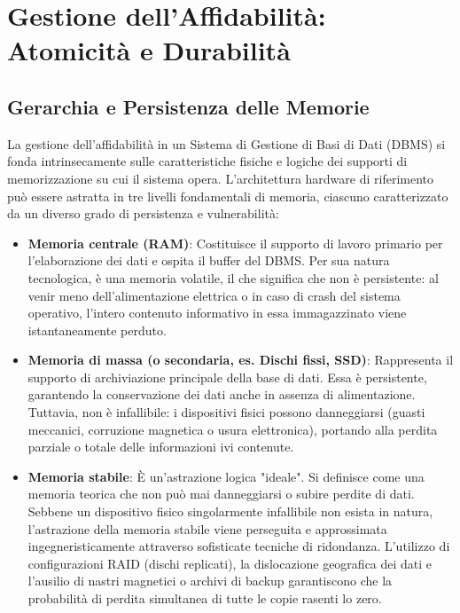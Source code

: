 \chapter{Gestione dell'Affidabilità: Atomicità e Durabilità}

\section{Gerarchia e Persistenza delle Memorie}

La gestione dell'affidabilità in un Sistema di Gestione di Basi di Dati (DBMS) si fonda intrinsecamente sulle caratteristiche fisiche e logiche dei supporti di memorizzazione su cui il sistema opera. L'architettura hardware di riferimento può essere astratta in tre livelli fondamentali di memoria, ciascuno caratterizzato da un diverso grado di persistenza e vulnerabilità:

\begin{itemize}
    \item \textbf{Memoria centrale (RAM)}: Costituisce il supporto di lavoro primario per l'elaborazione dei dati e ospita il buffer del DBMS. Per sua natura tecnologica, è una memoria volatile, il che significa che non è persistente: al venir meno dell'alimentazione elettrica o in caso di crash del sistema operativo, l'intero contenuto informativo in essa immagazzinato viene istantaneamente perduto.
    \item \textbf{Memoria di massa (o secondaria, es. Dischi fissi, SSD)}: Rappresenta il supporto di archiviazione principale della base di dati. Essa è persistente, garantendo la conservazione dei dati anche in assenza di alimentazione. Tuttavia, non è infallibile: i dispositivi fisici possono danneggiarsi (guasti meccanici, corruzione magnetica o usura elettronica), portando alla perdita parziale o totale delle informazioni ivi contenute.
    \item \textbf{Memoria stabile}: È un'astrazione logica "ideale". Si definisce come una memoria teorica che non può mai danneggiarsi o subire perdite di dati. Sebbene un dispositivo fisico singolarmente infallibile non esista in natura, l'astrazione della memoria stabile viene perseguita e approssimata ingegneristicamente attraverso sofisticate tecniche di ridondanza. L'utilizzo di configurazioni RAID (dischi replicati), la dislocazione geografica dei dati e l'ausilio di nastri magnetici o archivi di backup garantiscono che la probabilità di perdita simultanea di tutte le copie rasenti lo zero.
\end{itemize}

